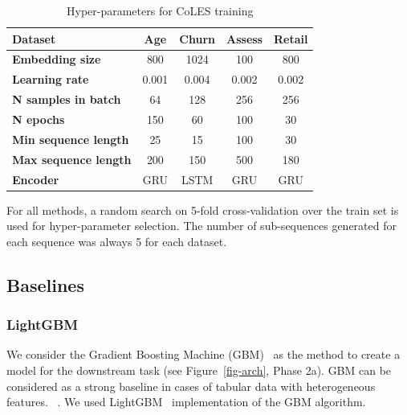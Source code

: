 \documentclass[sigconf, anonymous]{acmart}
\begin{document}
\begin{table}
\centering
\caption{Hyper-parameters for CoLES training}
\begin{tabularx}{\linewidth}{Xcccc}
\toprule
\textbf{Dataset} & \textbf{Age} & \textbf{Churn} & \textbf{Assess} & \textbf{Retail} \\
\midrule
\textbf{Embedding size} & 800 & 1024 & 100 & 800 \\
\textbf{Learning rate} & 0.001 & 0.004 & 0.002 & 0.002 \\
\textbf{N samples in batch} & 64 & 128 & 256 & 256 \\
\textbf{N epochs} & 150 & 60 & 100 & 30 \\
\textbf{Min sequence length} & 25 & 15 & 100 & 30 \\
\textbf{Max sequence length} & 200 & 150 & 500 & 180 \\
\textbf{Encoder} & GRU & LSTM & GRU & GRU \\
\bottomrule
\end{tabularx}
\small{For all methods, a random search on 5-fold cross-validation over the train set is used for hyper-parameter selection. The number of sub-sequences generated for each sequence was always 5 for each dataset.}
\label{tab-hyper}
\end{table}


\subsection{Baselines} \label{sec-baselines}


\subsubsection{LightGBM}

We consider the Gradient Boosting Machine (GBM)~\citep{Friedman2001GreedyFA} as the method to create a model for the downstream task (see Figure~\ref{fig-arch}, Phase 2a). GBM can be considered as a strong baseline in cases of tabular data with heterogeneous features.
~\citep{Wu2009AdaptingBF, Vorobev2019LearningTS, Zhang2015AGB, Niu2019ACS}. We used LightGBM~\citep{Ke2017LightGBMAH} implementation of the GBM algorithm.
\end{document}
